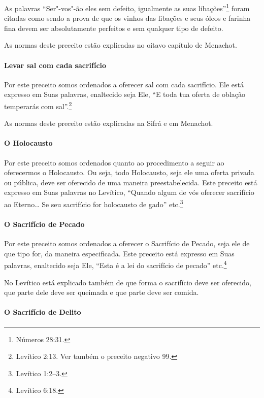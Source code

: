 \begin{multicols}{2}
As palavras ``Ser"-vos"-ão eles sem defeito, igualmente as suas libações''\footnote{Números 28:31.} foram citadas como sendo a prova de que os vinhos das
libações e seus óleos e farinha fina devem ser absolutamente perfeitos
e sem qualquer tipo de defeito.

As normas deste preceito estão explicadas no oitavo capítulo de Menachot\starr.

\paragraph{Levar sal com cada sacrifício}

Por este preceito somos ordenados a oferecer sal com cada sacrifício.
Ele está expresso em Suas palavras, enaltecido seja Ele, ``E toda tua
oferta de oblação temperarás com sal''.\footnote{Levítico
2:13. Ver também o preceito negativo 99.}

As normas deste preceito estão explicadas na Sifrá\starr{} e em Menachot\starr.

\paragraph{O Holocausto}

Por este preceito somos ordenados quanto ao procedimento a seguir ao
oferecermos o Holocausto. Ou seja, todo Holocausto, seja ele uma oferta
privada ou pública, deve ser oferecido de uma maneira preestabelecida.
Este preceito está expresso em Suas palavras no Levítico, ``Quando algum
de vós oferecer sacrifício ao Eterno\ldots{} Se seu sacrifício for holocausto
de gado'' etc.\footnote{Levítico 1:2--3.}

\paragraph{O Sacrifício de Pecado}

Por este preceito somos ordenados a oferecer o Sacrifício de Pecado,
seja ele de que tipo for, da maneira especificada. Este preceito está
expresso em Suas palavras, enaltecido seja Ele, ``Esta é a lei do
sacrifício de pecado'' etc.\footnote{Levítico 6:18.}

No Levítico está explicado também de que forma o sacrifício deve ser
oferecido, que parte dele deve ser queimada e que parte deve ser comida.

\paragraph{O Sacrifício de Delito}


\end{multicols}
